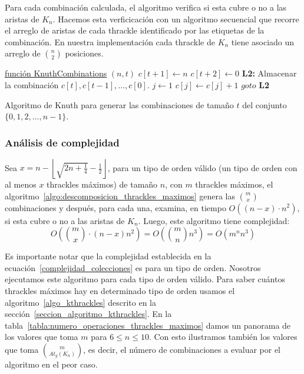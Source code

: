   Para cada combinación calculada, el algoritmo verifica si esta cubre o no a las aristas
  de $K_n$. Hacemos esta verficicación con un algoritmo secuencial que recorre el arreglo
  de aristas de cada thrackle identificado por las etiquetas de la combinación. En
  nuestra implementación cada thrackle de $K_n$ tiene asociado un arreglo de
  $\binom{n}{2}$ posiciones.
  \begin{algorithm}[h]
    \DontPrintSemicolon
    \underline{función KnuthCombinations} $(n,t)$\;
    $c[t+1] \gets n$\;
    $c[t+2] \gets 0$\;
    \textbf{L2: } \;
    Almacenar la combinación $c[t],c[t-1],\dots,c[0]$. \;
    $j \gets 1$ \;
    $c[j] \gets c[j]+1$ \;
    $goto$\textbf{ L2}\;
    \caption{Algoritmo de Knuth para generar las combinaciones de tamaño $t$ del conjunto $\{0,1,2,\dots,n-1\}$.}
    \label{algo:knuth_combinaciones}
  \end{algorithm}


  \subsubsection{Análisis de complejidad}
  Sea $x=n - \left\lfloor\sqrt{2n + \frac{1}{4}} - \frac{1}{2}\right\rfloor$, para un tipo de orden válido (un tipo de orden con al menos $x$ thrackles máximos) de tamaño $n$, con $m$ thrackles máximos, el algoritmo~\ref{algo:descomposicion_thrackles_maximos} genera las
  $\binom{m}{x}$ combinaciones y después, para cada una, examina, en tiempo $O((n - x) \cdot n^2)$, si esta cubre o no a las aristas de $K_n$. Luego, este algoritmo tiene complejidad:
  \begin{equation}\displaystyle
    O\left(\binom{m}{x}\cdot ( n- x ) n^2 \right) = O \left( \binom{m}{n} n^3 \right) = O(m^n n^3)
    \label{complejidad_colecciones}
  \end{equation}

  Es importante notar que la complejidad establecida en la
  ecuación~\ref{complejidad_colecciones} es para un tipo de orden. Nosotros
  ejecutamos este algoritmo para cada tipo de orden válido. Para saber cuántos thrackles
  máximos hay en determinado tipo de orden usamos el algoritmo~\ref{algo_kthrackles} descrito en la
  sección~\ref{seccion_algoritmo_kthrackles}. En la
  tabla~\ref{tabla:numero_operaciones_thrackles_maximos} damos un panorama de los valores que toma
  $m$ para $6\leq n \leq 10$. Con esto ilustramos también los valores que toma
  $\binom{m}{At_g(K_n)}$, es decir, el número de  combinaciones a evaluar por el algoritmo en el
  peor caso.

